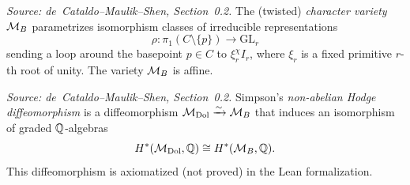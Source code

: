 \begin{definition}
  \label{def:CharacterVariety}
  \uses{}
  \textit{Source: de~Cataldo--Maulik--Shen, Section~0.2.}
  The (twisted) \emph{character variety} \(\mathcal{M}_B\) parametrizes isomorphism
  classes of irreducible representations
  \[
    \rho \colon \pi_1(C \setminus \{p\}) \to \mathrm{GL}_r
  \]
  sending a loop around the basepoint \(p \in C\) to \(\xi_r^\chi I_r\), where
  \(\xi_r\) is a fixed primitive \(r\)-th root of unity.  The variety \(\mathcal{M}_B\)
  is affine.
\end{definition}

\begin{definition}
  \label{def:NonabelianHodgeDiffeo}
  \textit{Source: de~Cataldo--Maulik--Shen, Section~0.2.}
  Simpson's \emph{non-abelian Hodge diffeomorphism} is a diffeomorphism
  \(\mathcal{M}_{\mathrm{Dol}} \xrightarrow{\sim} \mathcal{M}_B\) that induces an isomorphism of graded
  \(\mathbb{Q}\)-algebras
  \[
    H^*(\mathcal{M}_{\mathrm{Dol}}, \mathbb{Q}) \cong H^*(\mathcal{M}_B, \mathbb{Q}).
  \]
  This diffeomorphism is axiomatized (not proved) in the Lean formalization.
\end{definition}

